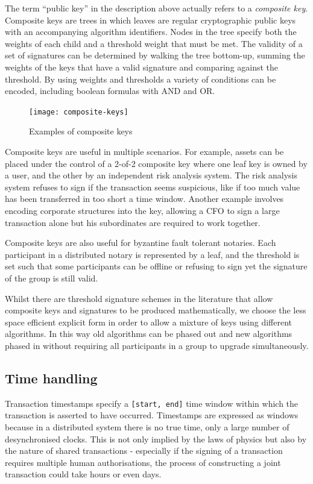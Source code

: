 \documentclass{article}
\begin{document}
The term ``public key'' in the description above actually refers to a \emph{composite key}. Composite keys are
trees in which leaves are regular cryptographic public keys with an accompanying algorithm identifiers. Nodes in
the tree specify both the weights of each child and a threshold weight that must be met. The validity of a set of
signatures can be determined by walking the tree bottom-up, summing the weights of the keys that have a valid
signature and comparing against the threshold. By using weights and thresholds a variety of conditions can be
encoded, including boolean formulas with AND and OR.

\begin{figure}[H]
\texttt{[image: composite-keys]}
\caption{Examples of composite keys}
\end{figure}

Composite keys are useful in multiple scenarios. For example, assets can be placed under the control of a 2-of-2
composite key where one leaf key is owned by a user, and the other by an independent risk analysis system. The risk
analysis system refuses to sign if the transaction seems suspicious, like if too much value has been transferred in
too short a time window. Another example involves encoding corporate structures into the key, allowing a CFO to
sign a large transaction alone but his subordinates are required to work together.

Composite keys are also useful for byzantine fault tolerant notaries. Each participant in a distributed notary is
represented by a leaf, and the threshold is set such that some participants can be offline or refusing to sign yet
the signature of the group is still valid.

Whilst there are threshold signature schemes in the literature that allow composite keys and signatures to be
produced mathematically, we choose the less space efficient explicit form in order to allow a mixture of keys using
different algorithms. In this way old algorithms can be phased out and new algorithms phased in without requiring
all participants in a group to upgrade simultaneously.

\subsection{Time handling}\label{sec:timestamps}

Transaction timestamps specify a \texttt{[start, end]} time window within which the transaction is asserted to have
occurred. Timestamps are expressed as windows because in a distributed system there is no true time, only a large
number of desynchronised clocks. This is not only implied by the laws of physics but also by the nature of shared
transactions - especially if the signing of a transaction requires multiple human authorisations, the process of
constructing a joint transaction could take hours or even days.
\end{document}
